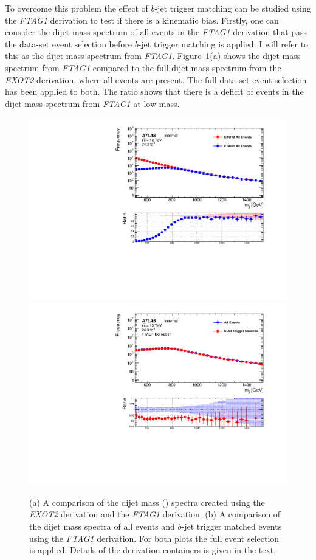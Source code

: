 To overcome this problem the effect of $b$-jet trigger matching can be studied using the \textit{FTAG1} derivation
to test if there is a kinematic bias.
Firstly, one can consider the dijet mass spectrum of all events in the \textit{FTAG1} derivation
that pass the \lm{} data-set event selection before $b$-jet trigger matching is applied.
I will refer to this as the dijet mass spectrum from \textit{FTAG1}.
Figure~\ref{fig:evt-btrig_match}(a) shows the dijet mass spectrum from \textit{FTAG1}
compared to the full dijet mass spectrum from the \textit{EXOT2} derivation, where all events are present.
The full \lm{} data-set event selection has been applied to both.
The ratio shows that there is a deficit of events in the dijet mass spectrum from \textit{FTAG1} at low mass.

\begin{figure}[!ht]
  \begin{center}
    \captionsetup[subfigure]{aboveskip=0pt,justification=centering}
    \subcaptionbox{} {\includegraphics[width=0.5\linewidth, angle=0]{figs/Dibjet/LowMass/evt-trigmatch_exot2.pdf} }\hspace{-5mm}
    \subcaptionbox{} {\includegraphics[width=0.5\linewidth, angle=0]{figs/Dibjet/LowMass/evt-trigmatch_ftag1.pdf} }
  \end{center}
  \vspace{-1em}
  \caption{(a) A comparison of the dijet mass (\mjj) spectra created using the \textit{EXOT2} derivation and the \textit{FTAG1} derivation.
    (b) A comparison of the dijet mass spectra of all events and $b$-jet trigger matched events using the \textit{FTAG1} derivation.
    For both plots the full \lm{} event selection is applied. Details of the derivation containers is given in the text. }
     \label{fig:evt-btrig_match}
\end{figure}

